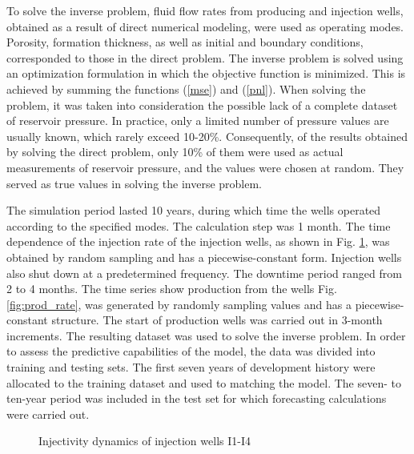 \documentclass[
11pt,%
tightenlines,%
twoside,%
onecolumn,%
nofloats,%
nobibnotes,%
nofootinbib,%
superscriptaddress,%
noshowpacs,%
centertags]%
{revtex4}
\begin{document}
To solve the inverse problem, fluid flow rates from producing and injection wells, obtained as a result of direct numerical modeling, were used as operating modes. Porosity, formation thickness, as well as initial and boundary conditions, corresponded to those in the direct problem.
The inverse problem is solved using an optimization formulation in which the objective function is minimized. This is achieved by summing the functions (\ref{mse}) and (\ref{pnl}).
When solving the problem, it was taken into consideration the possible lack of a complete dataset of reservoir pressure. In practice, only a limited number of pressure values are usually known, which rarely exceed 10-20\%. Consequently, of the results obtained by solving the direct problem, only 10\% of them were used as actual measurements of reservoir pressure, and the values were chosen at random. They served as true values in solving the inverse problem.

The simulation period lasted 10 years, during which time the wells operated according to the specified modes. The calculation step was 1 month. The time dependence of the injection rate of the injection wells, as shown in Fig. \ref{fig:inj_rate}, was obtained by random sampling and has a piecewise-constant form. Injection wells also shut down at a predetermined frequency. The downtime period ranged from 2 to 4 months. 
The time series show production from the wells Fig. \ref{fig:prod_rate}, was generated by randomly sampling values and has a piecewise-constant structure. The start of production wells was carried out in 3-month increments.
The resulting dataset was used to solve the inverse problem. In order to assess the predictive capabilities of the model, the data was divided into training and testing sets. The first seven years of development history were allocated to the training dataset and used to matching the model. The seven- to ten-year period was included in the test set for which forecasting calculations were carried out.

\begin{figure}
	\caption{Injectivity dynamics of injection wells I1-I4}
	\label{fig:inj_rate}
\end{figure}
\end{document}
